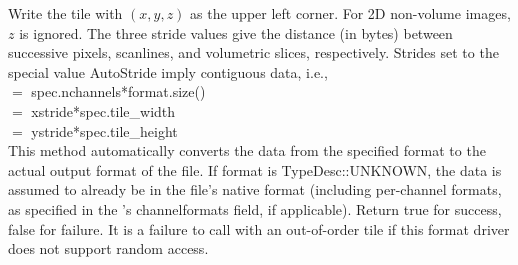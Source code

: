 \apiend


Write the tile with $(x,y,z)$ as the upper left corner.  For 2D
non-volume images, $z$ is ignored.  The three stride values give the
distance (in bytes) between successive pixels, scanlines, and volumetric
slices, respectively.  Strides set to the special value {\kw AutoStride}
imply contiguous data, i.e., \\
 $=$ {\kw spec.nchannels*format.size()} \\
 $=$ {\kw xstride*spec.tile_width} \\
 $=$ {\kw ystride*spec.tile_height} \\
This method automatically converts the
data from the specified {\kw format} to the actual output format of the
file. 
If {\cf format} is {\cf TypeDesc::UNKNOWN}, the data is assumed to
already be in the file's native format (including per-channel formats, 
as specified in the \ImageSpec's {\cf channelformats} field, if applicable).
Return {\kw true} for success, {\kw false} for failure.  It is a
failure to call \writetile with an out-of-order tile if this
format driver does not support random access.

\apiend


